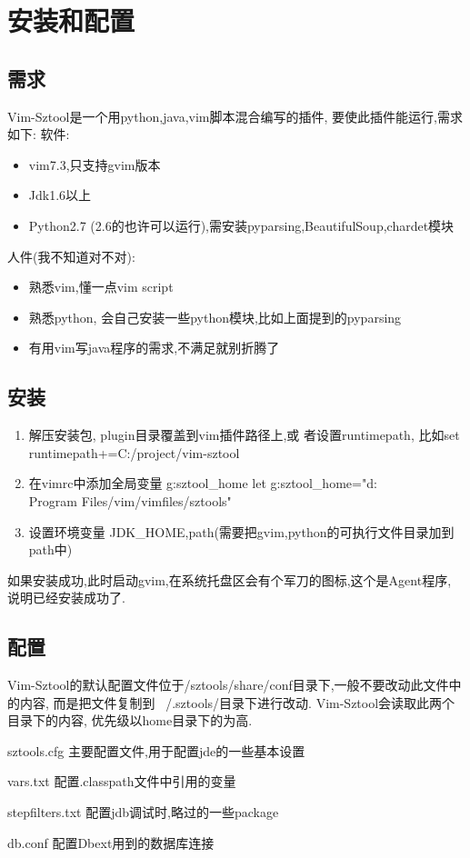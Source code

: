 \documentclass[oneside,openany]{book}
\begin{document}
\chapter{安装和配置}
  \section{需求}
  Vim-Sztool是一个用python,java,vim脚本混合编写的插件, 要使此插件能运行,需求如下:
  软件:
    \begin{itemize}
      \item vim7.3,只支持gvim版本
      \item Jdk1.6以上
      \item Python2.7 (2.6的也许可以运行),需安装pyparsing,BeautifulSoup,chardet模块
    \end{itemize}

  人件(我不知道对不对):
    \begin{itemize}
      \item 熟悉vim,懂一点vim script
      \item 熟悉python, 会自己安装一些python模块,比如上面提到的pyparsing
      \item 有用vim写java程序的需求,不满足就别折腾了
    \end{itemize}

  \section{安装}
    \begin{enumerate}
      \item 解压安装包, plugin目录覆盖到vim插件路径上,或
      者设置runtimepath, 比如set runtimepath+=C:/project/vim-sztool
      \item 在vimrc中添加全局变量 g:sztool\_home
      let g:sztool\_home="d:\\Program Files/vim/vimfiles/sztools"
      \item 设置环境变量
      JDK\_HOME,path(需要把gvim,python的可执行文件目录加到path中)
    \end{enumerate}
   如果安装成功,此时启动gvim,在系统托盘区会有个军刀的图标,这个是Agent程序,
   说明已经安装成功了.

  \section{配置}
    Vim-Sztool的默认配置文件位于/sztools/share/conf目录下,一般不要改动此文件中的内容,
  而是把文件复制到 ~/.sztools/目录下进行改动. Vim-Sztool会读取此两个目录下的内容,
  优先级以home目录下的为高.
  \begin{description}
    \item{sztools.cfg} 主要配置文件,用于配置jde的一些基本设置
    \item{vars.txt} 配置.classpath文件中引用的变量
    \item{stepfilters.txt} 配置jdb调试时,略过的一些package
    \item{db.conf} 配置Dbext用到的数据库连接
  \end{description}
  
\end{document}
